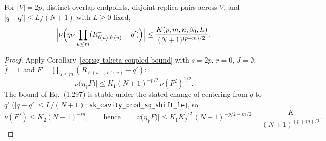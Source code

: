 \begin{corollary}\label{cor:sg-tal:eta-overlap-shifted-bound}
\leanok
{}
For $|V| = 2p$, distinct overlap endpoints, disjoint replica pairs across $V$,
and $|q-q'| \le L/(N+1)$ with $L \ge 0$ fixed,
\[
\Bigl|\nu\Bigl(\eta_V \prod_{u \le m} (R^-_{\ell(u), \ell'(u)} - q')\Bigr)\Bigr| \le \frac{K(p, m, n, \beta_0,L)}{(N+1)^{(p+m)/2}}.
\]
\end{corollary}
\begin{proof}
\leanok
Apply Corollary~\ref{cor:sg-tal:eta-coupled-bound} with $s=2p$, $r=0$, $J=\emptyset$, $\hat f=1$ and $F=\prod_{u\le m}(R^-_{\ell(u),\ell'(u)}-q')$:
\[
\Big|\nu\big(\eta_VF\big)\Big|\le K_1(N+1)^{-p/2}\,\nu(F^2)^{1/2}.
\]
The bound of Eq.~(1.297) is stable under the stated change of centering from $q$ to $q'$ ($|q-q'|\le L/(N+1)$; \texttt{sk\_cavity\_prod\_sq\_shift\_le}), so
\[
\nu(F^2)\le K_2(N+1)^{-m},\qquad\text{hence}\qquad\Big|\nu\big(\eta_VF\big)\Big|\le K_1K_2^{1/2}\,(N+1)^{-p/2-m/2}=\frac{K}{(N+1)^{(p+m)/2}} .
\]
\end{proof}


